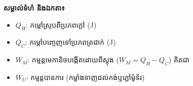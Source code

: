 \textbf{សម្គាល់ទំហំ និងឯកតា៖}
\begin{itemize}
\item $Q_H$: កម្ដៅស្រូបពីប្រភពក្ដៅ (J)
\item $Q_C$: កម្ដៅបញ្ចេញទៅប្រភពត្រជាក់ (J)
\item $W_M$: កម្មន្តមេកានិចបង្កើតដោយពីស្តុង ($W_M = Q_H - Q_C$) គិតជា 
\item $W_U$: កម្មន្តបានការ (កម្លាំងទាញដល់កង់ឬភ្លៅម៉ូទ័រ)
\end{itemize}
	\tanbgdivider